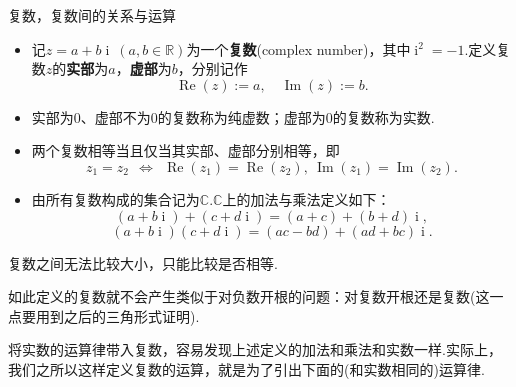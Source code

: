 \documentclass[lang=cn, zihao=5]{elegantbook}
\newcommand{\R}{\mathbb{R}}
\newcommand{\C}{\mathbb{C}}
\DeclareMathOperator{\CRe}{Re}
\DeclareMathOperator{\CIm}{Im}
\DeclareMathOperator{\ii}{i}
\begin{document}
\newpage
\begin{definition}{复数，复数间的关系与运算}
	\begin{itemize}
		\item 记$z=a+b\ii ~(a,b \in \R )$为一个\textbf{复数}(complex number)，其中$\ii ^2=-1$.定义复数$z$的\textbf{实部}为$a$，\textbf{虚部}为$b$，分别记作$$\CRe (z):=a,\quad \CIm (z):=b.$$
		\item 实部为$0$、虚部不为$0$的复数称为纯虚数；虚部为$0$的复数称为实数.
		\item 两个复数相等当且仅当其实部、虚部分别相等，即$$z_1=z_2 ~~ \Leftrightarrow ~~ \CRe (z_1) = \CRe (z_2) ,~ \CIm (z_1) = \CIm (z_2).$$
		\item 由所有复数构成的集合记为$\C$.$\C$上的加法与乘法定义如下：
			$$(a+b\ii ) + (c+d\ii ) = (a+c) + (b+d)\ii ,$$
			$$(a+b\ii )(c+d\ii ) = (ac-bd) + (ad+bc)\ii .$$
	\end{itemize}
\end{definition}
\begin{remark}
	复数之间无法比较大小，只能比较是否相等.
\end{remark}
\begin{remark}
	如此定义的复数就不会产生类似于对负数开根的问题：对复数开根还是复数(这一点要用到之后的三角形式证明).
\end{remark}
\begin{remark}
	将实数的运算律带入复数，容易发现上述定义的加法和乘法和实数一样.实际上，我们之所以这样定义复数的运算，就是为了引出下面的(和实数相同的)运算律.
\end{remark}
\end{document}
